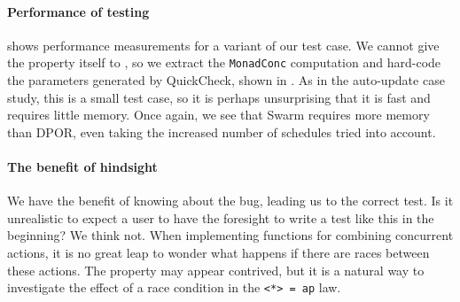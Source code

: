 \paragraph{Performance of testing}
 shows performance measurements for a
variant of our test case.  We cannot give the property itself to
\dejafu{}, so we extract the \verb|MonadConc| computation and
hard-code the parameters generated by QuickCheck, shown in
.  As in the auto-update case study,
this is a small test case, so it is perhaps unsurprising that it is
fast and requires little memory.  Once again, we see that Swarm
requires more memory than DPOR, even taking the increased number of
schedules tried into account.

\paragraph{The benefit of hindsight}
We have the benefit of knowing about the bug, leading us to the
correct test.  Is it unrealistic to expect a user to have the
foresight to write a test like this in the beginning?  We think not.
When implementing functions for combining concurrent actions, it is no
great leap to wonder what happens if there are races between these
actions.  The property may appear contrived, but it is a natural way
to investigate the effect of a race condition in the \verb|<*> = ap|
law.

